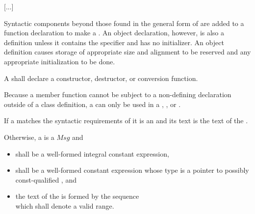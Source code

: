 \documentclass{wg21}
\begin{document}
\pnum
{}%

\textcolor{noteclr}{[...]}

\pnum
{}%
Syntactic components beyond those found in the general form of
 are added to a function declaration to make a
. An object declaration, however, is also
a definition unless it contains the  specifier and has no
initializer.
%
An object definition causes storage of appropriate size and alignment to be reserved and
any appropriate initialization to be done.

\pnum
A  shall declare a
constructor, destructor, or conversion function.
\begin{note}
 Because a member function cannot be subject to a non-defining declaration
 outside of a class definition, a 
 can only be used in a ,
 , or
 .
\end{note}


\begin{addedblock}
\pnum

If a  matches the syntactic requirements of 
it is an  and its text is the text of the .

Otherwise, a  is a  $Msg$ and
\begin{itemize}
    \item {} shall be a well-formed integral constant expression,
    \item {} shall be a well-formed constant expression whose type is a pointer to possibly const-qualified , and
    \item the text of the  is formed by the sequence\\ \tcode{[$Msg$.data(), $Msg$.data() + $Msg$.size())} which shall denote a valid range.
\end{itemize}
\end{addedblock}
\end{document}
